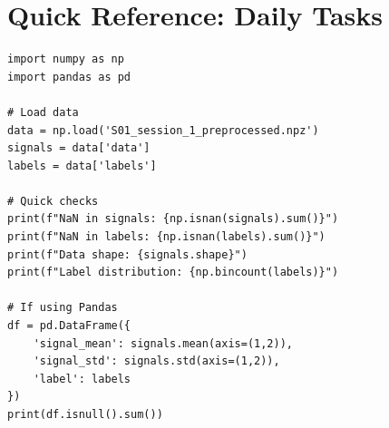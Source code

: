 \documentclass[12pt,a4paper]{article}
\begin{document}
\section{Quick Reference: Daily Tasks}

\begin{lstlisting}[caption={Your Daily Task - Check NULL Values}]
import numpy as np
import pandas as pd

# Load data
data = np.load('S01_session_1_preprocessed.npz')
signals = data['data']
labels = data['labels']

# Quick checks
print(f"NaN in signals: {np.isnan(signals).sum()}")
print(f"NaN in labels: {np.isnan(labels).sum()}")
print(f"Data shape: {signals.shape}")
print(f"Label distribution: {np.bincount(labels)}")

# If using Pandas
df = pd.DataFrame({
    'signal_mean': signals.mean(axis=(1,2)),
    'signal_std': signals.std(axis=(1,2)),
    'label': labels
})
print(df.isnull().sum())
\end{lstlisting}

\end{document}
